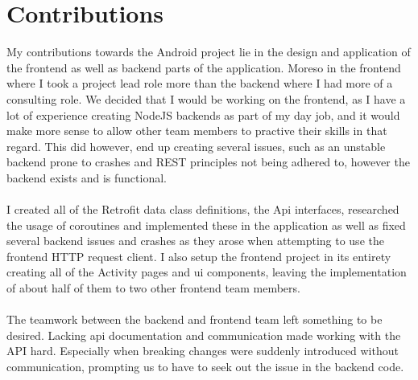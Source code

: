 \section{Contributions}
My contributions towards the Android project lie in the design and application of the frontend as well as backend parts of the application. Moreso in the frontend where I took a project lead role more than the backend where I had more of a consulting role. We decided that I would be working on the frontend, as I have a lot of experience creating NodeJS backends as part of my day job, and it would make more sense to allow other team members to practive their skills in that regard. This did however, end up creating several issues, such as an unstable backend prone to crashes and REST principles not being adhered to, however the backend exists and is functional.
\\\\
I created all of the Retrofit data class definitions, the Api interfaces, researched the usage of coroutines and implemented these in the application as well as fixed several backend issues and crashes as they arose when attempting to use the frontend HTTP request client. I also setup the frontend project in its entirety creating all of the Activity pages and ui components, leaving the implementation of about half of them to two other frontend team members.
\\\\
The teamwork between the backend and frontend team left something to be desired. Lacking api documentation and communication made working with the API hard. Especially when breaking changes were suddenly introduced without communication, prompting us to have to seek out the issue in the backend code.
\\\\